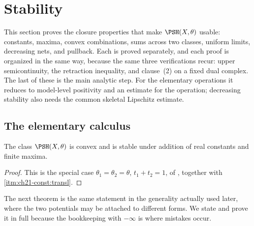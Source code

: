 \section{Stability}
\label{sec:ch21-stability}

This section proves the closure properties that make
$\PSH(X,\theta)$ usable: constants, maxima, convex combinations, sums
across two classes, uniform limits, decreasing nets, and pullback.  Each is
proved separately, and each proof is organized in the same way, because the
same three verifications recur: upper semicontinuity, the retraction
inequality, and clause~(2) on a fixed dual complex.  The last of these is
the main analytic step.  For the elementary operations it reduces to
model-level positivity and an estimate for the operation; decreasing
stability also needs the common skeletal Lipschitz estimate.

\subsection{The elementary calculus}
\label{sec:ch21-elementary-calculus}

\begin{proposition}\label{prop:ch21-elementary-stability}
The class $\PSH(X,\theta)$ is convex and is stable under addition of real
constants and finite maxima.
\end{proposition}

\begin{proof}
This is the special case $\theta_1=\theta_2=\theta$,
$t_1+t_2=1$, of , together with
\,\cref{itm:ch21-const:transl}.
\end{proof}

The next theorem is the same statement in the generality actually used
later, where the two potentials may be attached to different forms.  We
state and prove it in full because the bookkeeping with $-\infty$ is where
mistakes occur.

